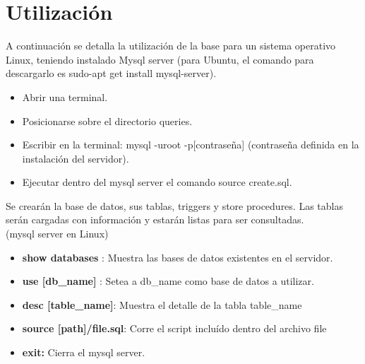 \documentclass[11pt, a4paper, spanish]{article}
\begin{document}
\section{Utilizaci\'on}
    A continuaci\'on se detalla la utilizaci\'on de la base para un sistema operativo Linux, 
    teniendo instalado Mysql server (para Ubuntu, el comando para descargarlo es sudo-apt get install mysql-server).\\

\begin{itemize}
    \item{Abrir una terminal.}
    \item{Posicionarse sobre el directorio queries.}
    \item{Escribir en la terminal: mysql -uroot -p[contrase\~{n}a] (contrase\~{n}a definida en la instalaci\'on del servidor).}
    \item{Ejecutar dentro del mysql server el comando source create.sql.}
\end{itemize}

Se crear\'an la base de datos, sus tablas, triggers y store procedures. Las tablas ser\'an cargadas con informaci\'on y estar\'an listas para ser consultadas.\\

 (mysql server en Linux)

\begin{itemize}
    \item{\textbf{show databases} :} Muestra las bases de datos existentes en el servidor.
    \item{\textbf{use [db\_name]} :} Setea a db\_name como base de datos a utilizar.
    \item{\textbf{desc [table\_name]}:} Muestra el detalle de la tabla table\_name
    \item{\textbf{source [path]/file.sql}:} Corre el script inclu\'ido dentro del archivo file
    \item{\textbf{exit:}} Cierra el mysql server.
\end{itemize}
\end{document}

